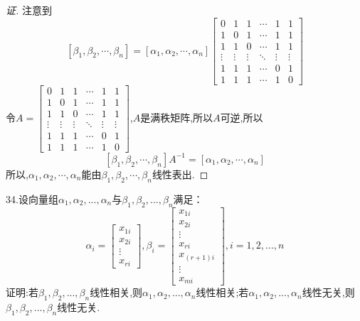 \documentclass[10pt,a4paper]{report}
\begin{document}
\begin{proof}[证]
	注意到
	$$
	[\beta_{1}, \beta_{2}, \cdots, \beta_{n}] = [\alpha_{1}, \alpha_{2}, \cdots, \alpha_{n}]\left[
	\begin{matrix}
	0 & 1 & 1 & \cdots & 1 & 1 \\
	1 & 0 & 1 & \cdots & 1 & 1 \\
	1 & 1 & 0 & \cdots & 1 & 1 \\
	\vdots & \vdots & \vdots & \ddots & \vdots & \vdots \\
	1 & 1 & 1 & \cdots & 0 & 1\\
	1 & 1 & 1 & \cdots & 1 & 0
	\end{matrix}
	\right]
	$$
	令$A = \left[
	\begin{matrix}
	0 & 1 & 1 & \cdots & 1 & 1 \\
	1 & 0 & 1 & \cdots & 1 & 1 \\
	1 & 1 & 0 & \cdots & 1 & 1 \\
	\vdots & \vdots & \vdots & \ddots & \vdots & \vdots \\
	1 & 1 & 1 & \cdots & 0 & 1\\
	1 & 1 & 1 & \cdots & 1 & 0
	\end{matrix}
	\right]$,$A$是满秩矩阵,所以$A$可逆,所以
	$$
	[\beta_{1}, \beta_{2}, \cdots, \beta_{n}]A^{-1} = [\alpha_{1}, \alpha_{2}, \cdots, \alpha_{n}]
	$$
	所以,$\alpha_{1}, \alpha_{2}, \cdots, \alpha_{n}$能由$\beta_{1}, \beta_{2}, \cdots, \beta_{n}$线性表出.
\end{proof}
\noindent 34.设向量组$\alpha_{1},\alpha_{2},...,\alpha_{n}$与$\beta_{1},\beta_{2},...,\beta_{n}$满足：
$$
\alpha_{i} = \left[
\begin{matrix}
x_{1i}\\
x_{2i}\\
\vdots\\
x_{ri}
\end{matrix}
\right], \beta_{i} = \left[
\begin{matrix}
x_{1i}\\
x_{2i}\\
\vdots\\
x_{ri}\\
x_{(r+1)i}\\
\vdots\\
x_{mi}
\end{matrix}
\right],i=1,2,...,n
$$
证明:若$\beta_{1},\beta_{2},...,\beta_{n}$线性相关,则$\alpha_{1},\alpha_{2},...,\alpha_{n}$线性相关;若$\alpha_{1},\alpha_{2},...,\alpha_{n}$线性无关,则$\beta_{1},\beta_{2},...,\beta_{n}$线性无关.
\end{document}
